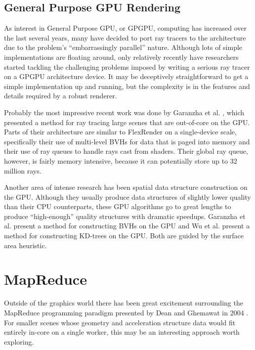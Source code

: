 \documentclass[12pt]{ucthesis}
\begin{document}
\subsection{General Purpose GPU Rendering}
\label{gpgpu}

As interest in General Purpose GPU, or GPGPU, computing has increased over
the last several years, many have decided to port ray tracers to the
architecture due to the problem's ``embarrassingly parallel'' nature. Although
lots of simple implementations are floating around, only relatively recently
have researchers started tackling the challenging problems imposed by writing
a serious ray tracer on a GPGPU architecture device. It may be deceptively
straightforward to get a simple implementation up and running, but the
complexity is in the features and details required by a robust renderer.

Probably the most impressive recent work was done by Garanzha et al.
\cite{garanzha:2011:ray}, which presented a method for ray tracing large scenes that
are out-of-core on the GPU. Parts of their architecture are similar to FlexRender
on a single-device scale, specifically their use of multi-level BVHs for data that
is paged into memory and their use of ray queues to handle rays cast from shaders.
Their global ray queue, however, is fairly memory intensive, because it can
potentially store up to 32 million rays.

Another area of intense research has been spatial data structure construction
on the GPU. Although they usually produce data structures of slightly lower
quality than their CPU counterparts, these GPU algorithms go to great lengths
to produce ``high-enough'' quality structures with dramatic speedups. Garanzha
et al. \cite{garanzha:2011:bvh} present a method for constructing BVHs on the
GPU and Wu et al. \cite{wu:2011} present a method for constructing KD-trees on
the GPU. Both are guided by the surface area heuristic.

\section{MapReduce}
\label{mapreduce}

Outside of the graphics world there has been great excitement surrounding
the MapReduce programming paradigm presented by Dean and Ghemawat in 2004
\cite{dean:2004}. For smaller scenes whose geometry and acceleration structure
data would fit entirely in-core on a single worker, this may be an interesting
approach worth exploring.
\end{document}
